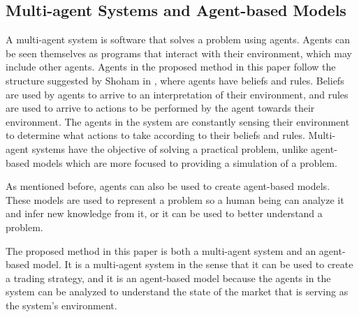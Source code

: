 \documentclass[review]{elsarticle}
\begin{document}
\subsection{Multi-agent Systems and Agent-based Models}
\label{subsection:multi-agent-systems-and-agent-based-models}

A multi-agent system is software that solves a problem using agents. Agents can be seen themselves as programs that interact with their environment, which may include other agents. Agents in the proposed method in this paper follow the structure suggested by Shoham in \cite{shoham1993agent}, where agents have beliefs and rules. Beliefs are used by agents to arrive to an interpretation of their environment, and rules are used to arrive to actions to be performed by the agent towards their environment. The agents in the system are constantly sensing their environment to determine what actions to take according to their beliefs and rules. Multi-agent systems have the objective of solving a practical problem, unlike agent-based models which are more focused to providing a simulation of a problem.

As mentioned before, agents can also be used to create agent-based models. These models are used to represent a problem so a human being can analyze it and infer new knowledge from it, or it can be used to better understand a problem.

The proposed method in this paper is both a multi-agent system and an agent-based model. It is a multi-agent system in the sense that it can be used to create a trading strategy, and it is an agent-based model because the agents in the system can be analyzed to understand the state of the market that is serving as the system's environment.


\end{document}
